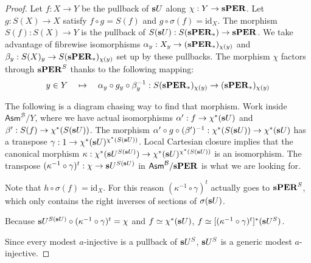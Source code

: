 \documentclass{amsart}
\theoremstyle{plain}
\theoremstyle{definition}
\newcommand\hide[1]{}
\newcommand\cat\mathcal
\newcommand\set[1]{\left\{#1\right\}}
\newcommand\id{\mathrm{id}}
\newcommand\ri{^*}
\newcommand\Asm{\mathsf{Asm}}
\begin{document}
\begin{proof}
Let $f:X\to Y$ be the pullback of $\mathbf{s} U$ along $\chi:Y\to \mathbf{s} \mathbf{PER}$. Let $g:S(X) \to X$ satisfy $f\circ g = S(f)$ and $g\circ \sigma(f) = \id_X$. The morphism $S(f):S(X)\to Y$ is the pullback of $S(\mathbf{s} U):S(\mathbf{s}\mathbf{PER}_*) \to \mathbf{s}\mathbf{PER}$. We take advantage of fibrewise isomorphisms $\alpha_y:X_y \to (\mathbf{s}\mathbf{PER}_*)_{\chi(y)}$ and $\beta_y:S(X)_y\to S(\mathbf{s}\mathbf{PER}_*)_{\chi(y)}$ set up by these pullbacks. The morphism $\chi$ factors through $\mathbf{s}\mathbf{PER}^S$ thanks to the following mapping: 
\[ y\in Y \quad \mapsto \quad \alpha_y\circ g_y\circ \beta_y^{-1}:S(\mathbf{s}\mathbf{PER}_*)_{\chi(y)}\to (\mathbf{s}\mathbf{PER}_*)_{\chi(y)} \]

\hide{generalized elements}
The following is a diagram chasing way to find that morphism.
Work inside $\Asm^{\cat B}/Y$, where we have actual isomorphisms $\alpha':f\to \chi\ri(\rat U)$ and $\beta':S(f)\to\chi\ri(S(\rat U))$. 
The morphism $\alpha'\circ g\circ (\beta')^{-1}:\chi\ri(S(\rat U)) \to \chi\ri(\rat U)$ has a transpose $\gamma:1\to \chi\ri(\rat U)^{\chi\ri(S(\rat U))}$. 
Local Cartesian closure implies that the canonical morphism $\kappa:\chi\ri(\rat U^{S(\rat U)})\to \chi\ri(\rat U)^{\chi\ri(S(\rat U))}$ is an isomorphism.
The transpose $(\kappa^{-1}\circ\gamma)^t:\chi\to \mathbf{s} U^{S(\mathbf{s} U)}$ in $\Asm^{\cat B}/\rat\pers$ is what we are looking for.

Note that $h\circ \sigma(f) = \id_X$. For this reason $(\kappa^{-1}\circ\gamma)^t$ actually goes to $\mathbf{s}\mathbf{PER}^S$, which only contains the right inverses of sections of $\sigma(\mathbf{s} U)$.
\hide{Kunnen we vast aantonen met de juiste pullbacks, maar misschien gaat dat te ver.}

Because $\mathbf{s} U^{S(\mathbf{s} U)}\circ (\kappa^{-1}\circ\gamma)^t = \chi$ and $f\simeq \chi\ri(\rat U)$, $f\simeq [(\kappa^{-1}\circ\gamma)^t]\ri(\rat U^S)$. 

Since every modest $a$-injective is a pullback of $\mathbf{s} U^S$, $\mathbf{s} U^S$ is a generic modest $a$-injective. %
\end{proof}

\end{document}
